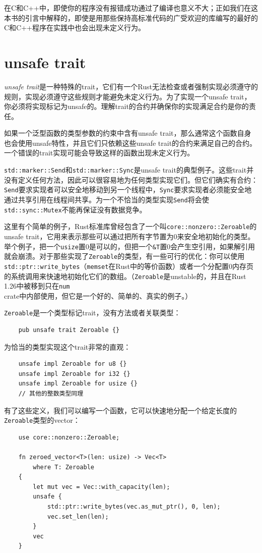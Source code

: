 在C和C++中，即使你的程序没有报错成功通过了编译也意义不大；正如我们在这本书的引言中解释的，即使是用那些保持高标准代码的广受欢迎的库编写的最好的C和C++程序在实践中也会出现未定义行为。

\section{unsafe trait}\label{UnsafeTrait}
\emph{unsafe trait}是一种特殊的trait，它们有一个Rust无法检查或者强制实现必须遵守的规则，实现必须遵守这些规则才能避免未定义行为。为了实现一个unsafe trait，你必须将实现标记为unsafe的。理解trait的合约并确保你的实现满足合约是你的责任。

如果一个泛型函数的类型参数的约束中含有unsafe trait，那么通常这个函数自身也会使用unsafe特性，并且它们只依赖这些unsafe trait的合约来满足自己的合约。一个错误的trait实现可能会导致这样的函数出现未定义行为。

\texttt{std::marker::Send}和\texttt{std::marker::Sync}是unsafe trait的典型例子。这些trait并没有定义任何方法，因此可以很容易地为任何类型实现它们。但它们确实有合约：\texttt{Send}要求实现者可以安全地移动到另一个线程中，\texttt{Sync}要求实现者必须能安全地通过共享引用在线程间共享。为一个不恰当的类型实现\texttt{Send}将会使\texttt{std::sync::Mutex}不能再保证没有数据竞争。

这里有个简单的例子，Rust标准库曾经包含了一个叫\texttt{core::nonzero::Zeroable}的unsafe trait，它用来表示那些可以通过把所有字节置为0来安全地初始化的类型。举个例子，把一个\texttt{usize}置0是可以的，但把一个\texttt{\&T}置0会产生空引用，如果解引用就会崩溃。对于那些实现了\texttt{Zeroable}的类型，有一些可行的优化：你可以使用\texttt{std::ptr::write\_bytes}（\texttt{memset}在Rust中的等价函数）或者一个分配置0内存页的系统调用来快速地初始化它们的数组。（\texttt{Zeroable}是unstable的，并且在Rust 1.26中被移到只在\texttt{num} crate中内部使用，但它是一个好的、简单的、真实的例子。）

\texttt{Zeroable}是一个类型标记trait，没有方法或者关联类型：
\begin{verbatim}
    pub unsafe trait Zeroable {}
\end{verbatim}

为恰当的类型实现这个trait非常的直观：
\begin{verbatim}
    unsafe impl Zeroable for u8 {}
    unsafe impl Zeroable for i32 {}
    unsafe impl Zeroable for usize {}
    // 其他的整数类型同理
\end{verbatim}

有了这些定义，我们可以编写一个函数，它可以快速地分配一个给定长度的\texttt{Zeroable}类型的vector：
\begin{verbatim}
    use core::nonzero::Zeroable;

    fn zeroed_vector<T>(len: usize) -> Vec<T>
        where T: Zeroable
    {
        let mut vec = Vec::with_capacity(len);
        unsafe {
            std::ptr::write_bytes(vec.as_mut_ptr(), 0, len);
            vec.set_len(len);
        }
        vec
    }
\end{verbatim}

